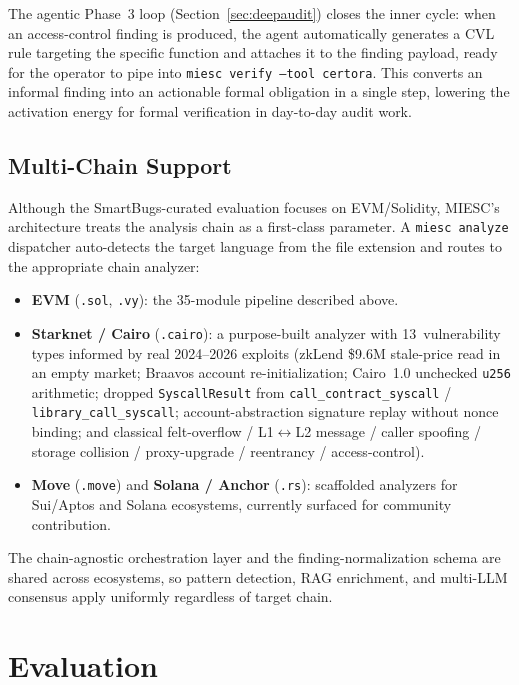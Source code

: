 \documentclass[conference]{IEEEtran}
\begin{document}
The agentic Phase~3 loop (Section~\ref{sec:deepaudit}) closes the inner cycle: when an access-control finding is produced, the agent automatically generates a CVL rule targeting the specific function and attaches it to the finding payload, ready for the operator to pipe into \texttt{miesc verify --tool certora}. This converts an informal finding into an actionable formal obligation in a single step, lowering the activation energy for formal verification in day-to-day audit work.

\subsection{Multi-Chain Support}

Although the SmartBugs-curated evaluation focuses on EVM/Solidity, MIESC's architecture treats the analysis chain as a first-class parameter. A \texttt{miesc analyze} dispatcher auto-detects the target language from the file extension and routes to the appropriate chain analyzer:

\begin{itemize}
    \item \textbf{EVM} (\texttt{.sol}, \texttt{.vy}): the 35-module pipeline described above.
    \item \textbf{Starknet / Cairo} (\texttt{.cairo}): a purpose-built analyzer with 13~vulnerability types informed by real 2024--2026 exploits (zkLend \$9.6M stale-price read in an empty market; Braavos account re-initialization; Cairo~1.0 unchecked \texttt{u256} arithmetic; dropped \texttt{SyscallResult} from \texttt{call\_contract\_syscall} / \texttt{library\_call\_syscall}; account-abstraction signature replay without nonce binding; and classical felt-overflow / L1$\leftrightarrow$L2 message / caller spoofing / storage collision / proxy-upgrade / reentrancy / access-control).
    \item \textbf{Move} (\texttt{.move}) and \textbf{Solana / Anchor} (\texttt{.rs}): scaffolded analyzers for Sui/Aptos and Solana ecosystems, currently surfaced for community contribution.
\end{itemize}

The chain-agnostic orchestration layer and the finding-normalization schema are shared across ecosystems, so pattern detection, RAG enrichment, and multi-LLM consensus apply uniformly regardless of target chain.

\section{Evaluation}
\end{document}
